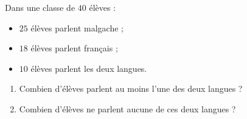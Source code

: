Dans une classe de $40$ élèves :
\begin{itemize}
  \item $25$ élèves parlent malgache ;
  \item $18$ élèves parlent français ;
  \item $10$ élèves parlent les deux langues.
\end{itemize}
\begin{enumerate}
  \item Combien d'élèves parlent au moins l'une des deux langues ?
  \item Combien d'élèves ne parlent aucune de ces deux langues ?
\end{enumerate}
